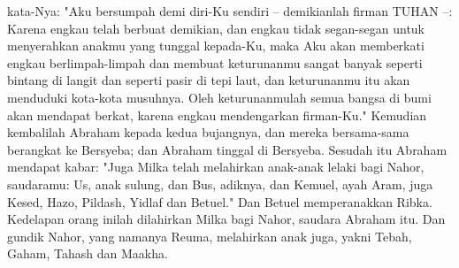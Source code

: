 \begin{biblechapter}
\verse kata-Nya: "Aku bersumpah demi diri-Ku sendiri -- demikianlah firman TUHAN --: Karena engkau telah berbuat demikian, dan engkau tidak segan-segan untuk menyerahkan anakmu yang tunggal kepada-Ku,
\verse maka Aku akan memberkati engkau berlimpah-limpah dan membuat keturunanmu sangat banyak seperti bintang di langit dan seperti pasir di tepi laut, dan keturunanmu itu akan menduduki kota-kota musuhnya.
\verse Oleh keturunanmulah semua bangsa di bumi akan mendapat berkat, karena engkau mendengarkan firman-Ku."
\verse Kemudian kembalilah Abraham kepada kedua bujangnya, dan mereka bersama-sama berangkat ke Bersyeba; dan Abraham tinggal di Bersyeba.
 Sesudah itu Abraham mendapat kabar: "Juga Milka telah melahirkan anak-anak lelaki bagi Nahor, saudaramu:
\verse Us, anak sulung, dan Bus, adiknya, dan Kemuel, ayah Aram,
\verse juga Kesed, Hazo, Pildash, Yidlaf dan Betuel."
\verse Dan Betuel memperanakkan Ribka. Kedelapan orang inilah dilahirkan Milka bagi Nahor, saudara Abraham itu.
\verse Dan gundik Nahor, yang namanya Reuma, melahirkan anak juga, yakni Tebah, Gaham, Tahash dan Maakha.
\end{biblechapter}

